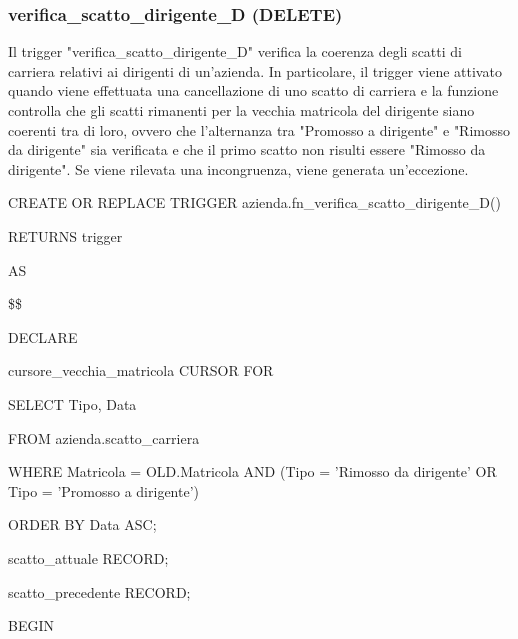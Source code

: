         \subsubsection{verifica\_scatto\_dirigente\_D (DELETE)}
        Il trigger "verifica\_scatto\_dirigente\_D"  verifica la coerenza degli scatti di carriera relativi ai dirigenti di un'azienda. In particolare, il trigger viene attivato quando viene effettuata una cancellazione di uno scatto di carriera e la funzione controlla che gli scatti rimanenti per la vecchia matricola del dirigente siano coerenti tra di loro, ovvero che l'alternanza tra "Promosso a dirigente" e "Rimosso da dirigente" sia verificata e che il primo scatto non risulti essere "Rimosso da dirigente". Se viene rilevata una incongruenza, viene generata un'eccezione.
        \ttfamily
            \begin{flushleft}
                \begin{description}
                    \item CREATE OR REPLACE TRIGGER azienda.fn\_verifica\_scatto\_dirigente\_D()  
                    \item RETURNS trigger
                    \item AS
                    \item \$\$
                    \item DECLARE
                    \begin{description}
                        \item cursore\_vecchia\_matricola CURSOR FOR 
                        \begin{description}
                            \item SELECT Tipo, Data
                            \item FROM azienda.scatto\_carriera
                            \item WHERE Matricola = OLD.Matricola AND (Tipo = 'Rimosso da dirigente' OR Tipo = 'Promosso a dirigente')
                            \item ORDER BY Data ASC;
                        \end{description}
                        \item scatto\_attuale RECORD;
                        \item scatto\_precedente RECORD;
                    \end{description}
                    \item BEGIN 
                    \begin{description}

\end{description}
\end{description}
\end{flushleft}
